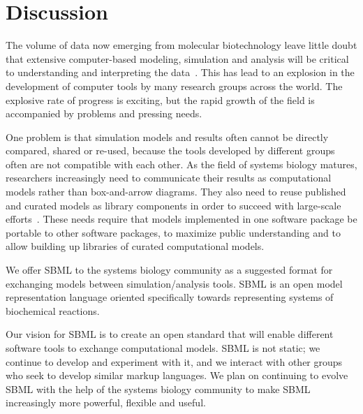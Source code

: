
\section{Discussion}
\label{sec:discussion}

The volume of data now emerging from molecular biotechnology leave
little doubt that extensive computer-based modeling, simulation
and analysis will be critical to understanding and interpreting
the data~\citep{abbott:1999,gilman:2000,popel:1998,smaglik:2000}.
This has lead to an explosion in the development of computer tools
by many research groups across the world.  The explosive rate of
progress is exciting, but the rapid growth of the field is
accompanied by problems and pressing needs.

One problem is that simulation models and results often cannot be
directly compared, shared or re-used, because the tools developed
by different groups often are not compatible with each other.  As
the field of systems biology matures, researchers increasingly
need to communicate their results as computational models rather
than box-and-arrow diagrams.  They also need to reuse published
and curated models as library components in order to succeed with
large-scale efforts~\citep[e.g., the Alliance for Cellular
Signaling;][]{gilman:2000,smaglik:2000}.  These needs require that
models implemented in one software package be portable to other
software packages, to maximize public understanding and to allow
building up libraries of curated computational models.

We offer SBML to the systems biology community as a suggested
format for exchanging models between simulation/analysis tools.
SBML is an open model representation language oriented
specifically towards representing systems of biochemical
reactions.

Our vision for SBML is to create an open standard that will enable
different software tools to exchange computational models.  SBML
is not static; we continue to develop and experiment with it, and
we interact with other groups who seek to develop similar markup
languages.  We plan on continuing to evolve SBML with the help of
the systems biology community to make SBML increasingly more
powerful, flexible and useful.


